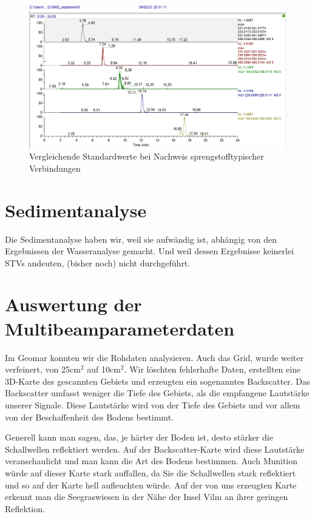 \begin{figure}[htb!]
\includegraphics[height=\textheight,%
                   width=\textwidth,%
                   keepaspectratio]{Bilder/Explosives_5ppb.PNG}
\caption{Vergleichende Standardwerte bei Nachweis sprengstofftypischer Verbindungen}
\end{figure}

\section{Sedimentanalyse}
Die Sedimentanalyse haben wir, weil sie aufwändig ist, abhängig von den Ergebnissen der Wasseranalyse gemacht. Und weil dessen Ergebnisse keinerlei STVs andeuten, (bisher noch) nicht durchgeführt.

\section{Auswertung der Multibeamparameterdaten}

Im Geomar konnten wir die Rohdaten analysieren. Auch das Grid, wurde weiter verfeinert, von 25cm$^2$ auf 10cm$^2$. 
Wir löschten fehlerhafte Daten, erstellten eine 3D-Karte des gescannten Gebiets und erzeugten ein sogenanntes \glqq Backscatter\grqq . 
Das Backscatter umfasst weniger die Tiefe des Gebiets, als die empfangene Lautstärke unserer Signale. 
Diese Lautstärke wird von der Tiefe des Gebiets und vor allem von der Beschaffenheit des Bodens bestimmt.

Generell kann man sagen, das, je härter der Boden ist, desto stärker die Schallwellen reflektiert werden. 
Auf der Backscatter-Karte wird diese Lautstärke veranschaulicht und man kann die Art des Bodens bestimmen.
Auch Munition würde auf dieser Karte stark auffallen, da Sie die Schallwellen stark reflektiert und so 
auf der Karte hell aufleuchten würde. Auf der von uns erzeugten Karte erkennt man die Seegraswiesen in der Nähe der Insel Vilm an ihrer geringen Reflektion.

